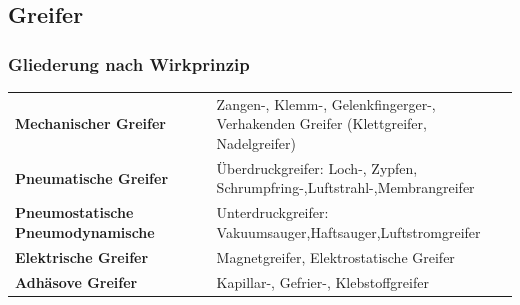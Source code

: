 \subsection{Greifer}
\begin{minipage}[t]{0.5\linewidth}
    \subsubsection{Gliederung nach Wirkprinzip}
    \begin{tabular}{p{0.4\linewidth} p{0.6\linewidth}}
        \textbf{Mechanischer Greifer}&
            Zangen-, Klemm-, Gelenkfingerger-, Verhakenden Greifer (Klettgreifer, Nadelgreifer)\\
        \textbf{Pneumatische Greifer}&
            Überdruckgreifer: Loch-, Zypfen, Schrumpfring-,Luftstrahl-,Membrangreifer\\
        \textbf{Pneumostatische Pneumodynamische}&
            Unterdruckgreifer: Vakuumsauger,Haftsauger,Luftstromgreifer\\
        \textbf{Elektrische Greifer}&
            Magnetgreifer, Elektrostatische Greifer\\
        \textbf{Adhäsove Greifer}&
            Kapillar-, Gefrier-, Klebstoffgreifer\\
    \end{tabular}
\end{minipage}
\clearpage

